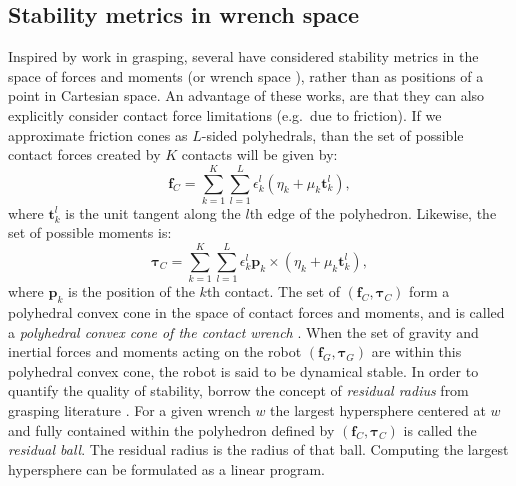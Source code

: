 \documentclass[12pt,a4paper,twoside]{article}
\newcommand{\vvc}[1]{{\bm{#1}}}
\begin{document}
\subsection{Stability metrics in wrench space}
Inspired by work in grasping, several have considered stability metrics in the space of forces and moments (or wrench space \cite{Takao}), rather than as positions of a point in Cartesian space. An advantage of these works, are that they can also explicitly  consider contact force limitations (e.g.\ due to friction). If we approximate friction cones as $L$-sided polyhedrals, than the set of possible contact forces created by $K$ contacts will be given by:
\begin{equation}
\vvc{f}_C = \sum\limits_{k=1}^{K}\sum\limits_{l=1}^{L}\epsilon_k^l (\eta_k + \mu_k \vvc{t}_k^l),
\end{equation}
where $\vvc{t}_k^l$ is the unit tangent along the $l$th edge of the polyhedron. Likewise, the set of possible moments is:
\begin{equation}
\vvc{\tau}_C = \sum\limits_{k=1}^{K}\sum\limits_{l=1}^{L}\epsilon_k^l\vvc{p}_k \times (\eta_k + \mu_k \vvc{t}_k^l),
\end{equation}
where $\vvc{p}_k$ is the position of the $k$th contact. The set of $(\vvc{f}_C,\vvc{\tau}_C)$ form a polyhedral convex cone in the space of contact forces and moments, and is called a \emph{polyhedral convex cone of the contact wrench} \cite{Hirukawa}. When the set of gravity and inertial forces and moments acting on the robot $(\vvc{f}_G,\vvc{\tau}_G)$ are within this polyhedral convex cone, the robot is said to be dynamical stable.  In order to quantify the quality of stability, \cite{barth2008} borrow the concept of \emph{residual radius} from grasping literature \cite{Kirkpatrick1992}. For a given wrench $w$ the largest hypersphere centered at $w$ and fully contained within the polyhedron defined by $(\vvc{f}_C,\vvc{\tau}_C)$ is called the \emph{residual ball}. The residual radius is the radius of that ball. Computing the largest hypersphere can be formulated as a linear program. 
\end{document}
